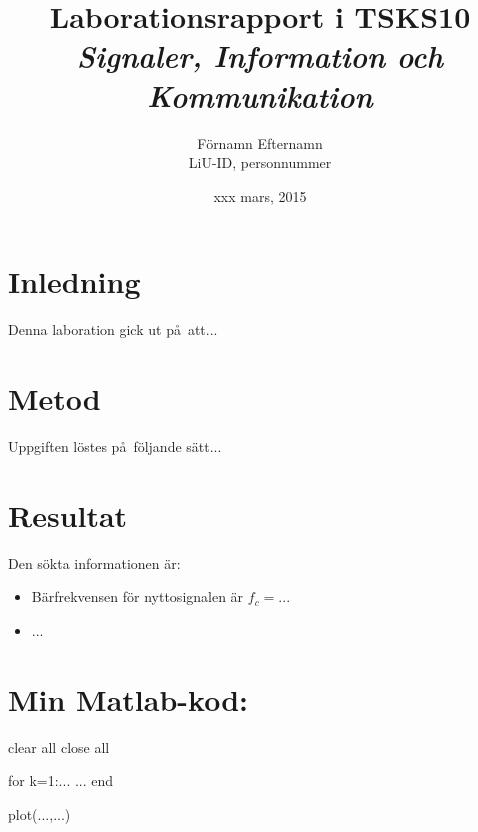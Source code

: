 \documentclass[10pt,twocolumn]{article}
\title{Laborationsrapport i TSKS10 \emph{Signaler, Information och Kommunikation}}
\author{F\"ornamn Efternamn \\ LiU-ID, personnummer }
\date{xxx mars, 2015}
\begin{document}
\maketitle

\section{Inledning}

Denna laboration gick ut p\aa\ att...

\section{Metod}

Uppgiften l\"ostes p\aa\ f\"oljande s\"att...

\section{Resultat}

Den s\"okta informationen \"ar:
\begin{itemize}
\item B\"arfrekvensen f\"or nyttosignalen \"ar $f_c=...$
\item ...
\end{itemize}

\clearpage

\section*{Min Matlab-kod:}
\begin{spverbatim}
clear all
close all

for k=1:...
  ...
end

plot(...,...)
\end{spverbatim}
\end{document}
